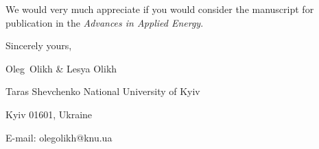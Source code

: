 \documentclass[preprint]{elsarticle}
\begin{document}
We would  very much appreciate if you would consider the manuscript for publication in the \emph{Advances in Applied Energy}.

%


\vspace{3mm}

Sincerely yours,

Oleg~Olikh \& Lesya Olikh


Taras Shevchenko National University of Kyiv


Kyiv 01601, Ukraine

E-mail: olegolikh@knu.ua


\end{document}
